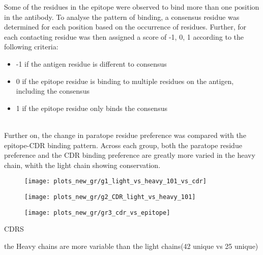 \documentclass{article}
\begin{document}
Some of the residues in the epitope were observed to bind more than one position in the antibody. To analyse the pattern of binding, a consensus residue was determined for each position based on the occurrence of residues. Further, for each contacting residue was then assigned a score  of  -1, 0, 1 according to the following criteria:
\begin{itemize}
 \item -1 if the antigen residue is different to consensus 
\item  0 if the epitope residue is binding to multiple residues on the antigen, including the consensus
\item 1 if the epitope residue only binds the consensus

\end{itemize}

\\
Further on, the change in paratope residue preference was compared with the epitope-CDR binding pattern. Across each group, both the paratope residue preference and the CDR binding preference are greatly more varied in the heavy chain, whith the light chain showing conservation.

\begin{figure}[hH]
	\centering
	\texttt{[image: plots\_new\_gr/g1\_light\_vs\_heavy\_101\_vs\_cdr]}
	\caption{}
	\label{fig:g1lightvsheavy101vscdr}
\end{figure}

\begin{figure}
	\centering
	\texttt{[image: plots\_new\_gr/g2\_CDR\_light\_vs\_heavy\_101]}
	\caption{}
	\label{fig:g2cdrlightvsheavy101}
\end{figure}
\begin{figure}[h]
	\centering
	\texttt{[image: plots\_new\_gr/gr3\_cdr\_vs\_epitope]}
	\caption{}
	\label{fig:gr3cdrvsepitope}
\end{figure}





\newpage

CDRS

the Heavy chains are more variable than the light chains(42 unique vs 25 unique)
\end{document}
